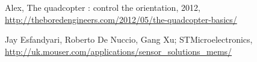 
\begin{thebibliography}{XXXX}

 Alex, The quadcopter : control the orientation, 2012, \url{http://theboredengineers.com/2012/05/the-quadcopter-basics/}

 Jay Esfandyari, Roberto De Nuccio, Gang Xu; STMicroelectronics, \url{http://uk.mouser.com/applications/sensor_solutions_mems/}
\end{thebibliography}





